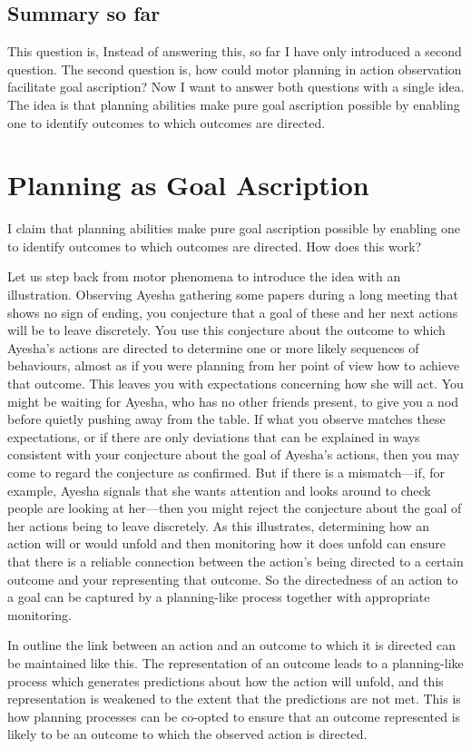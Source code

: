 \documentclass[12pt,\papersize]{extarticle}
\begin{document}
\subsection{Summary so far}
This question is, \theQuestion 
Instead of answering this, so far I have only introduced a second question.
The second question is, how could motor planning in action observation facilitate goal ascription?  
Now I want to answer both questions with a single idea.
The idea is that%
\newcommand{\theThesis}{planning abilities make pure goal ascription possible by enabling one to identify outcomes to which outcomes are directed. }
 \theThesis

\section{Planning as Goal Ascription}
I claim that \theThesis
How does this work?

Let us step back from motor phenomena to introduce the idea with an illustration.  
Observing Ayesha gathering some papers during a long meeting that shows no sign of ending, you conjecture that a goal of these and her next actions will be to leave discretely. You use this conjecture about the outcome to which Ayesha's actions are directed to determine one or more likely sequences of behaviours, almost as if you were planning from her point of view how to achieve that outcome. This leaves you with expectations concerning how she will act. You might be waiting for Ayesha, who has no other friends present, to give you a nod before quietly pushing away from the table. If what you observe matches these expectations, or if there are only deviations that can be explained in ways consistent with your conjecture about the goal of Ayesha's actions, then you may come to regard the conjecture as confirmed. But if there is a mismatch---if, for example, Ayesha signals that she wants attention and looks around to check people are looking at her---then you might reject the conjecture about the goal of her actions being to leave discretely. As this illustrates, determining how an action will or would unfold and then monitoring how it does unfold can ensure that there is a reliable connection between the action's being directed to a certain outcome and your representing that outcome. So the directedness of an action to a goal can be captured by a planning-like process together with appropriate monitoring.

In outline the link between an action and an outcome to which it is directed can be maintained like this. The representation of an outcome leads to a planning-like process which generates predictions about how the action will unfold, and this representation is weakened to the extent that the predictions are not met.  This is how planning processes can be co-opted to ensure that an outcome represented is likely to be an outcome to which the observed action is directed.
\end{document}
